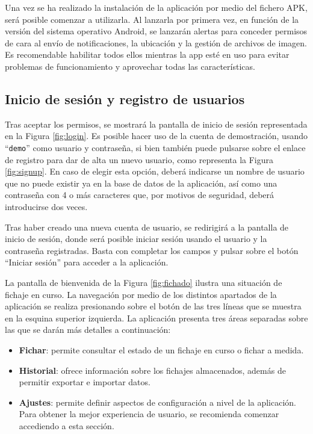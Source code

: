 Una vez se ha realizado la instalación de la aplicación por medio del fichero APK, será posible comenzar a utilizarla. Al lanzarla por primera vez, en función de la versión del sistema operativo Android, se lanzarán alertas para conceder permisos de cara al envío de notificaciones, la ubicación y la gestión de archivos de imagen. Es recomendable habilitar todos ellos mientras la app esté en uso para evitar problemas de funcionamiento y aprovechar todas las características.

\subsection{Inicio de sesión y registro de usuarios}

Tras aceptar los permisos, se mostrará la pantalla de inicio de sesión representada en la Figura \ref{fig:login}. Es posible hacer uso de la cuenta de demostración, usando “\texttt{demo}” como usuario y contraseña, si bien también puede pulsarse sobre el enlace de registro para dar de alta un nuevo usuario, como representa la Figura \ref{fig:signup}. En caso de elegir esta opción, deberá indicarse un nombre de usuario que no puede existir ya en la base de datos de la aplicación, así como una contraseña con 4 o más caracteres que, por motivos de seguridad, deberá introducirse dos veces.

Tras haber creado una nueva cuenta de usuario, se redirigirá a la pantalla de inicio de sesión, donde será posible iniciar sesión usando el usuario y la contraseña registradas. Basta con completar los campos y pulsar sobre el botón “Iniciar sesión” para acceder a la aplicación.

La pantalla de bienvenida de la Figura \ref{fig:fichado} ilustra una situación de fichaje en curso. La navegación por medio de los distintos apartados de la aplicación se realiza presionando sobre el botón de las tres líneas que se muestra en la esquina superior izquierda. La aplicación presenta tres áreas separadas sobre las que se darán más detalles a continuación:

\begin{itemize}
    \item \textbf{Fichar}: permite consultar el estado de un fichaje en curso o fichar a medida.
    \item \textbf{Historial}: ofrece información sobre los fichajes almacenados, además de permitir exportar e importar datos.
    \item \textbf{Ajustes}: permite definir aspectos de configuración a nivel de la aplicación. Para obtener la mejor experiencia de usuario, se recomienda comenzar accediendo a esta sección.
\end{itemize}

